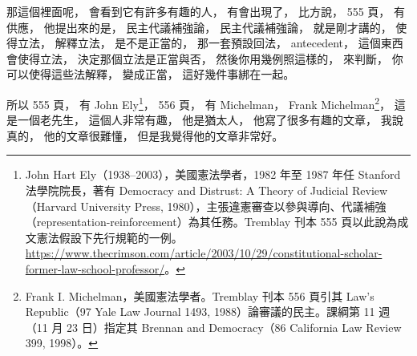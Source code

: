 \hypertarget{w02:cue:2729}{}那這個裡面呢，
\hypertarget{w02:cue:2730}{}會看到它有許多有趣的人，
\hypertarget{w02:cue:2731}{}有會出現了，
\hypertarget{w02:cue:2732}{}比方說，
\hypertarget{w02:cue:2733}{}555 頁，
\hypertarget{w02:cue:2734}{}有供應，
\hypertarget{w02:cue:2735}{}他提出來的是，
\hypertarget{w02:cue:2736}{}民主代議補強論，
\hypertarget{w02:cue:2737}{}民主代議補強論，
\hypertarget{w02:cue:2738}{}就是剛才講的，
\hypertarget{w02:cue:2739}{}使得立法，
\hypertarget{w02:cue:2740}{}解釋立法，
\hypertarget{w02:cue:2741}{}是不是正當的，
\hypertarget{w02:cue:2742}{}那一套預設回法，
\hypertarget{w02:cue:2743}{}antecedent，
\hypertarget{w02:cue:2744}{}這個東西會使得立法，
\hypertarget{w02:cue:2745}{}決定那個立法是正當與否，
\hypertarget{w02:cue:2746}{}然後你用幾例照這樣的，
\hypertarget{w02:cue:2747}{}來判斷，
\hypertarget{w02:cue:2748}{}你可以使得這些法解釋，
\hypertarget{w02:cue:2749}{}變成正當，
\hypertarget{w02:cue:2750}{}這好幾件事綁在一起。

\hypertarget{w02:cue:2751}{}所以 555 頁，
\hypertarget{w02:cue:2752}{}有 John Ely\footnote{John Hart Ely（1938–2003），美國憲法學者，1982 年至 1987 年任 Stanford 法學院院長，著有 Democracy and Distrust: A Theory of Judicial Review（Harvard University Press, 1980），主張違憲審查以參與導向、代議補強（representation-reinforcement）為其任務。Tremblay 刊本 555 頁以此說為成文憲法假設下先行規範的一例。\url{https://www.thecrimson.com/article/2003/10/29/constitutional-scholar-former-law-school-professor/}。}，
\hypertarget{w02:cue:2753}{}556 頁，
\hypertarget{w02:cue:2754}{}有 Michelman，
\hypertarget{w02:cue:2755}{}Frank Michelman\footnote{Frank I. Michelman，美國憲法學者。Tremblay 刊本 556 頁引其 Law's Republic（97 Yale Law Journal 1493, 1988）論審議的民主。課綱第 11 週（11 月 23 日）指定其 Brennan and Democracy（86 California Law Review 399, 1998）。}，
\hypertarget{w02:cue:2756}{}這是一個老先生，
\hypertarget{w02:cue:2757}{}這個人非常有趣，
\hypertarget{w02:cue:2758}{}他是猶太人，
\hypertarget{w02:cue:2759}{}他寫了很多有趣的文章，
\hypertarget{w02:cue:2760}{}我說真的，
\hypertarget{w02:cue:2761}{}他的文章很難懂，
\hypertarget{w02:cue:2762}{}但是我覺得他的文章非常好。

